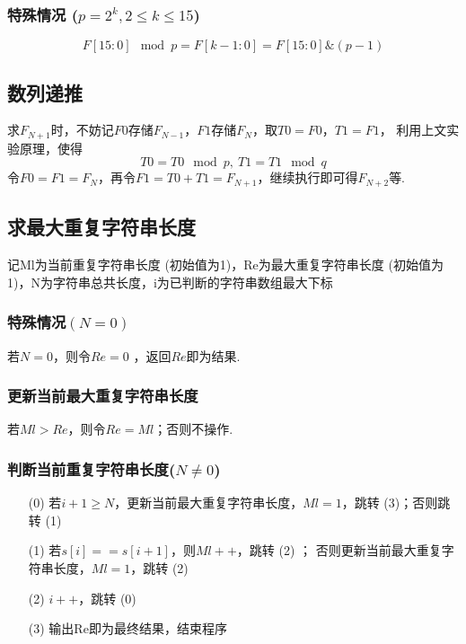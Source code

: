 \documentclass[UTF8]{ctexart}
\begin{document}
        \subsubsection{特殊情况 ($p=2^{k}, 2\leq k \leq 15$)}
            \[
                F[15:0] \mod p 
                = F[k-1:0]
                = F[15:0] \& (p-1)
            \]
    
    \subsection{数列递推}
    求$F_{N+1}$时，不妨记$F0$存储$F_{N-1}$，$F1$存储$F_{N}$，取$T0 = F0$，$T1 = F1$，
    利用上文实验原理，使得
    \[
        T0 = T0 \mod p,\ 
        T1 = T1 \mod q
    \]
    令$F0 = F1 = F_{N}$，再令$F1 = T0 + T1 = F_{N+1}$，继续执行即可得$F_{N+2}$等.
       
    \subsection{求最大重复字符串长度}
    记Ml为当前重复字符串长度 (初始值为1)，Re为最大重复字符串长度 (初始值为1)，N为字符串总共长度，i为已判断的字符串数组最大下标
        \subsubsection{特殊情况$(N=0)$}
            若$N=0$，则令$Re = 0$ ，返回$Re$即为结果.

        \subsubsection{更新当前最大重复字符串长度}
            若$Ml > Re$，则令$Re = Ml$；否则不操作.
    
        \subsubsection{判断当前重复字符串长度($N\neq 0$)}
            \begin{enumerate}
                \item [(0)]若$i+1 \geq N$，更新当前最大重复字符串长度，$Ml=1$，跳转 (3)；否则跳转 (1)
                \item [(1)]若$s[i] == s[i+1]$，则$Ml++$，跳转 (2) ； 否则更新当前最大重复字符串长度，$Ml=1$，跳转 (2)
                \item [(2)]$i++$，跳转 (0)
                \item [(3)]输出Re即为最终结果，结束程序
            \end{enumerate}
\end{document}
